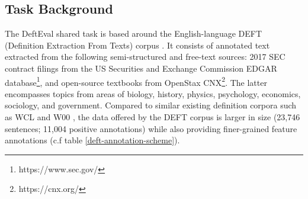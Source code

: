 \documentclass[11pt]{article}
\begin{document}
\subsection{Task Background}
\begin{table}[]
  \centering
  \caption{DEFT Tag Schema}
  \label{deft-annotation-scheme}
\end{table}

The DeftEval shared task is based around the English-language DEFT (Definition Extraction From Texts) corpus \cite{spala-etal-2019-deft}.
It consists of annotated text extracted from the following semi-structured and free-text sources: 2017 SEC contract filings from the US Securities and
Exchange Commission EDGAR database\footnote{https://www.sec.gov/}, and open-source textbooks from OpenStax CNX\footnote{https://cnx.org/}. The
latter encompasses topics from areas of biology, history, physics, psychology, economics, sociology, and government.
Compared to similar existing definition corpora such as WCL \cite{navigli2010learning} and W00 \cite{jin2013mining}, the data offered by the DEFT corpus is
larger in size (23,746 sentences; 11,004 positive annotations) while also providing finer-grained feature annotations
(c.f table \ref{deft-annotation-scheme}).\\
\end{document}
